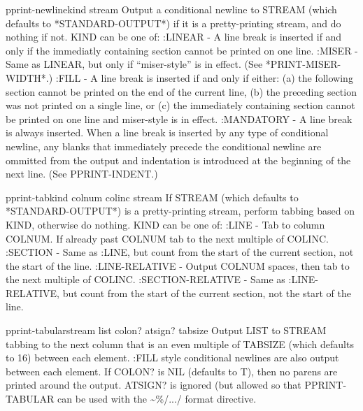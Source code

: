 \begin{function}{pprint-newline}{kind \op stream}
  Output a conditional newline to STREAM (which defaults to
   *STANDARD-OUTPUT*) if it is a pretty-printing stream, and do
   nothing if not. KIND can be one of:
     :LINEAR - A line break is inserted if and only if the immediatly
        containing section cannot be printed on one line.
     :MISER - Same as LINEAR, but only if ``miser-style'' is in effect.
        (See *PRINT-MISER-WIDTH*.)
     :FILL - A line break is inserted if and only if either:
       (a) the following section cannot be printed on the end of the
           current line,
       (b) the preceding section was not printed on a single line, or
       (c) the immediately containing section cannot be printed on one
           line and miser-style is in effect.
     :MANDATORY - A line break is always inserted.
   When a line break is inserted by any type of conditional newline, any
   blanks that immediately precede the conditional newline are ommitted
   from the output and indentation is introduced at the beginning of the
   next line. (See PPRINT-INDENT.)
\end{function}

\begin{function}{pprint-tab}{kind colnum colinc \op stream}
  If STREAM (which defaults to *STANDARD-OUTPUT*) is a pretty-printing
   stream, perform tabbing based on KIND, otherwise do nothing. KIND can
   be one of:
     :LINE - Tab to column COLNUM. If already past COLNUM tab to the next
       multiple of COLINC.
     :SECTION - Same as :LINE, but count from the start of the current
       section, not the start of the line.
     :LINE-RELATIVE - Output COLNUM spaces, then tab to the next multiple of
       COLINC.
     :SECTION-RELATIVE - Same as :LINE-RELATIVE, but count from the start
       of the current section, not the start of the line.
\end{function}

\begin{function}{pprint-tabular}{stream list \op colon? atsign? tabsize}
  Output LIST to STREAM tabbing to the next column that is an even multiple
   of TABSIZE (which defaults to 16) between each element. :FILL style
   conditional newlines are also output between each element. If COLON? is
   NIL (defaults to T), then no parens are printed around the output.
   ATSIGN? is ignored (but allowed so that PPRINT-TABULAR can be used with
   the \~{}\%/.../ format directive.
\end{function}

